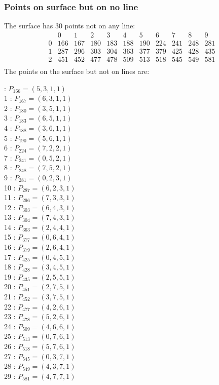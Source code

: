 \documentclass{article}
\begin{document}
{\subsubsection*{Points on surface but on no line}
The surface has 30 points not on any line:\\
$$
\begin{array}{r|*{10}{r}}
 & 0 & 1 & 2 & 3 & 4 & 5 & 6 & 7 & 8 & 9\\
\hline
0 & 166 & 167 & 180 & 183 & 188 & 190 & 224 & 241 & 248 & 281\\
1 & 287 & 296 & 303 & 304 & 363 & 377 & 379 & 425 & 428 & 435\\
2 & 451 & 452 & 477 & 478 & 509 & 513 & 518 & 545 & 549 & 581\\
\end{array}
$$
The points on the surface but not on lines are:\\
\begin{multicols}{2}
 : $P_{166}=( 5, 3, 1, 1 )$\\
1 : $P_{167}=( 6, 3, 1, 1 )$\\
2 : $P_{180}=( 3, 5, 1, 1 )$\\
3 : $P_{183}=( 6, 5, 1, 1 )$\\
4 : $P_{188}=( 3, 6, 1, 1 )$\\
5 : $P_{190}=( 5, 6, 1, 1 )$\\
6 : $P_{224}=( 7, 2, 2, 1 )$\\
7 : $P_{241}=( 0, 5, 2, 1 )$\\
8 : $P_{248}=( 7, 5, 2, 1 )$\\
9 : $P_{281}=( 0, 2, 3, 1 )$\\
10 : $P_{287}=( 6, 2, 3, 1 )$\\
11 : $P_{296}=( 7, 3, 3, 1 )$\\
12 : $P_{303}=( 6, 4, 3, 1 )$\\
13 : $P_{304}=( 7, 4, 3, 1 )$\\
14 : $P_{363}=( 2, 4, 4, 1 )$\\
15 : $P_{377}=( 0, 6, 4, 1 )$\\
16 : $P_{379}=( 2, 6, 4, 1 )$\\
17 : $P_{425}=( 0, 4, 5, 1 )$\\
18 : $P_{428}=( 3, 4, 5, 1 )$\\
19 : $P_{435}=( 2, 5, 5, 1 )$\\
20 : $P_{451}=( 2, 7, 5, 1 )$\\
21 : $P_{452}=( 3, 7, 5, 1 )$\\
22 : $P_{477}=( 4, 2, 6, 1 )$\\
23 : $P_{478}=( 5, 2, 6, 1 )$\\
24 : $P_{509}=( 4, 6, 6, 1 )$\\
25 : $P_{513}=( 0, 7, 6, 1 )$\\
26 : $P_{518}=( 5, 7, 6, 1 )$\\
27 : $P_{545}=( 0, 3, 7, 1 )$\\
28 : $P_{549}=( 4, 3, 7, 1 )$\\
29 : $P_{581}=( 4, 7, 7, 1 )$\\
\end{multicols}
}
\end{document}
